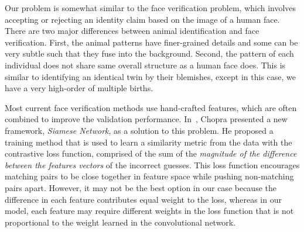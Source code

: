 Our problem is somewhat similar to the face verification problem, which
involves accepting or rejecting an identity claim based on the image of a human
face. There are two major differences between animal identification and face
verification. First, the animal patterns have finer-grained details and some can
be very subtle such that they fuse into the background. Second, the pattern of each
individual does not share same overall structure as a human face does. This is
similar to identifying an identical twin by their blemishes, except in this
case, we have a very high-order of multiple births.

Most current face verification methods use hand-crafted features, which are
often combined to improve the validation performance. In~\cite{chopra05},
Chopra presented a new framework, \emph{Siamese Network}, as a solution to this
problem. He proposed a training method that is used to learn a similarity
metric from the data with the contrastive loss function, comprised of the sum
of the \emph{magnitude of the difference between the features vectors} of the
incorrect guesses. This loss function encourages matching pairs to be close
together in feature space while pushing non-matching pairs apart. However, it
may not be the best option in our case because the difference in each feature
contributes equal weight to the loss, whereas in our model, each feature may
require different weights in the loss function that is not proportional to the
weight learned in the convolutional network.


